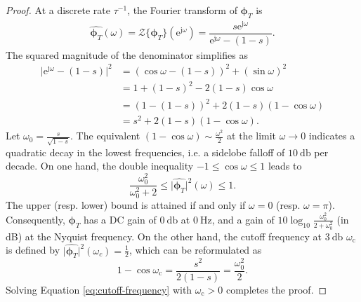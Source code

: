 \documentclass[journal]{IEEEtran}
\makeatletter
\newcommand*{\ie}{i.e.\@\xspace}
\newcommand*{\resp}{resp.\@\xspace}
\newtheorem*{prop*}{Proposition}
\theoremstyle{remark}
\makeatother
\begin{document}

\begin{proof}
At a discrete rate $\tau^{-1}$, the Fourier transform of $\boldsymbol{\phi}_T$ is
\begin{align}
\widehat{\boldsymbol{\phi}_T}  (\omega) =
\mathcal{Z}\{\boldsymbol{\phi}_T\}(\mathrm{e}^{\mathrm{j}\omega})
= \dfrac{s \mathrm{e}^{\mathrm{j}\omega}}{\mathrm{e}^{\mathrm{j}\omega} - (1-s)}.
\end{align}
The squared magnitude of the denominator simplifies as
\begin{align}
\vert \mathrm{e}^{\mathrm{j}\omega} - (1-s) \vert^2
& = (\cos \omega - (1-s))^2 + (\sin \omega)^2 \nonumber \\
& = 1 + (1-s)^2 - 2 (1-s) \cos \omega \nonumber \\
& = (1 - (1-s))^2 + 2 (1-s) (1 - \cos \omega) \nonumber \\
& = s^2 + 2 (1-s) (1 - \cos \omega).
\end{align}
Let $\omega_0 = \frac{s}{\sqrt{1-s}}$.
The equivalent $(1 - \cos \omega) \sim \frac{\omega^2}{2}$ at the limit $\omega \rightarrow 0$ indicates a quadratic decay in the lowest frequencies, \ie{} a sidelobe falloff of $\SI{10}{\decibel}$ per decade.
On one hand, the double inequality $-1 \leq \cos \omega \leq 1$ leads to 
\begin{equation}
\dfrac{\omega_0^2}{\omega_0^2 + 2} \leq \vert \widehat{\boldsymbol{\phi}_T} \vert^2 (\omega) \leq 1.
\end{equation}
The upper (\resp{} lower) bound is attained if and only if $\omega = 0$ (\resp{} $\omega = \pi$).
Consequently, $\boldsymbol{\phi}_T$ has a DC gain of $\SI{0}{\decibel}$ at $\SI{0}{\Hz}$, and a gain of $10 \log_{10} \frac{\omega_0^2}{2+\omega_0^2}$ (in dB) at the Nyquist frequency.
On the other hand, the cutoff frequency at $\SI{3}{\decibel}$ $\omega_{\mathrm{c}}$ is defined by $\vert\widehat{\boldsymbol{\phi}_T}\vert^2(\omega_c) = \frac{1}{2}$, which can be reformulated as
\begin{equation}
1 - \cos \omega_\mathrm{c} = \frac{ s^2}{2(1-s)} = \frac{\omega_0^2}{2}.
\label{eq:cutoff-frequency}
\end{equation}
Solving Equation \ref{eq:cutoff-frequency} with $\omega_\mathrm{c} > 0$ completes the proof.
\end{proof}
\end{document}
